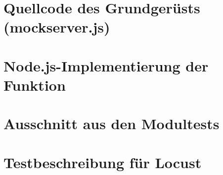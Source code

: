 \chapter{Quellcode des Grundgerüsts (mockserver.js)}


	
	
\chapter{Node.js-Implementierung der Funktion}

	
\chapter{Ausschnitt aus den Modultests}


\chapter{Testbeschreibung für Locust}


